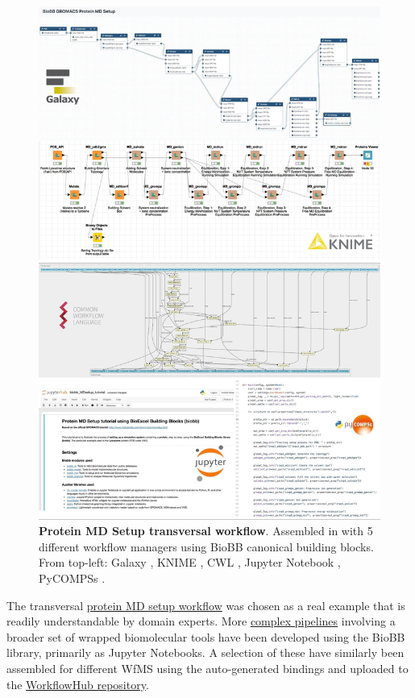 \begin{figure}%
  \includegraphics[width=\textwidth]{figures/ch06/figure2.png}
	\caption[Protein MD Setup transversal workflow]{\textbf{Protein MD Setup
  transversal workflow}. Assembled in with 5 different workflow
  managers using BioBB canonical building blocks. From top-left: Galaxy
  \cite{ch6-22}, KNIME \cite{ch6-23}, CWL \cite{ch6-24}, Jupyter Notebook \cite{ch6-25},
  PyCOMPSs \cite{ch6-26}.}
  \label{ch6:figure2}
\end{figure}

The transversal \href{https://workflowhub.eu/collections/3}{protein MD
setup workflow} was chosen as a real example that is readily
understandable by domain experts. More
\href{https://mmb.irbbarcelona.org/biobb/workflows}{complex pipelines}
involving a broader set of wrapped biomolecular tools have been
developed using the BioBB library, primarily as Jupyter Notebooks. A
selection of these have similarly been assembled for different WfMS
using the auto-generated bindings and uploaded to the
\href{https://workflowhub.eu/projects/11\#workflows}{WorkflowHub
repository}.

